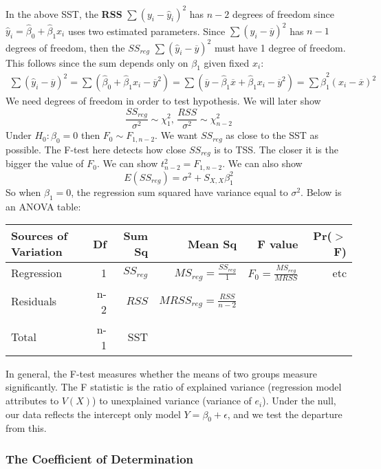 \documentclass[12pt, a4paper]{article}
\theoremstyle{definition}
\newcommand{\eps}{\epsilon}
\newcommand{\ol}{\overline}
\newcommand{\f}{\frac}
\begin{document}
		In the above SST, the {\bf RSS} $\sum (y_i - \hat y_i)^2 $ has $n-2$ degrees of freedom since $\hat y_i = \hat \beta_0 + \hat \beta_1 x_i$ uses two estimated parameters. Since $\sum (y_i - \ol y)^2$ has $n-1$ degrees of freedom, then the $SS_{reg}$ $\sum (\hat y_i - \ol y)^2$ must have 1 degree of freedom. This follows since the sum depends only on $\beta_1$ given fixed $x_i$:
		\begin{align*}
			\sum (\hat y_i - \ol y)^2 
			= \sum (\hat \beta_0 + \hat \beta_1 x_i - \ol y^2) 
			= \sum (\ol y - \hat \beta_1 \ol x + \hat \beta_1 x_i - \ol y^2) 
			= \sum \hat \beta_1^2 (x_i - \ol x)^2
		\end{align*}
		We need degrees of freedom in order to test hypothesis. We will later show
		$$
			\f{SS_{reg}}{\sigma^2} \sim \chi_1^2,\, \f{RSS}{\sigma^2} \sim \chi_{n-2}^2
		$$
 		Under $H_0: \beta_0 = 0$ then $F_0 \sim F_{1, n-2}$. We want $SS_{reg}$ as close to the SST as possible. The F-test here detects how close $SS_{reg}$ is to TSS. The closer it is the bigger the value of $F_0$. We can show $t^2_{n-2} = F_{1, n-2}$. We can also  show
 		$$
 			E(SS_{reg}) = \sigma^2 + S_{X,X}\beta_1^2
 		$$
		So when $\beta_1 = 0$, the regression sum squared have variance equal to $\sigma^2$. Below is an ANOVA table:
		
		\begin{table}[ht]
			\centering
			\begin{tabular}{lrrrrr}
				\hline
				Sources of Variation & Df & Sum Sq & Mean Sq & F value & Pr($>$F) \\ 
				\hline
				Regression & 1 & $SS_{reg}$ & $MS_{reg} = \f{SS_{reg}}{1}$  & $F_0 = \f{MS_{reg}}{MRSS}$ & etc \\ 
				Residuals & n-2 & $RSS$ & $MRSS_{reg} = \f{RSS}{n-2}$ &  &  \\ 
				\hline
				Total & n-1 & SST &&&
			\end{tabular}
		\end{table}
		In general, the F-test measures whether the means of two groups measure significantly. The F statistic is the ratio of explained variance (regression model attributes to $V(X)$) to unexplained variance (variance of $e_i$). Under the null, our data reflects the intercept only model $Y = \beta_0 + \eps$, and we test the departure from this.
		
		\subsubsection{The Coefficient of Determination}
		
\end{document}
